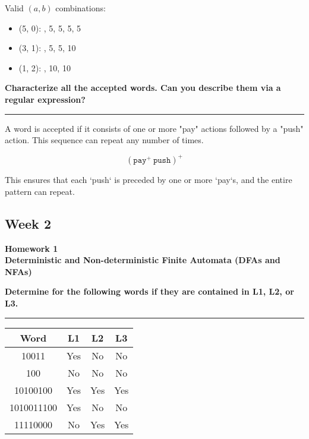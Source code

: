 \documentclass{article}
\theoremstyle{theorem}
\theoremstyle{definition}
\theoremstyle{remark}
\begin{document}
Valid \((a, b)\) combinations:
\begin{itemize}
    \item (5, 0): , 5, 5, 5, 5
    \item (3, 1): , 5, 5, 10
    \item (1, 2): , 10, 10
\end{itemize}

\vspace{1em}

\textbf{Characterize all the accepted words. Can you describe them via a regular expression?}

\vspace{0.5em}
\hrule
\vspace{0.5em}

A word is accepted if it consists of one or more "pay" actions followed by a "push" action.  
This sequence can repeat any number of times.

\[
(\texttt{pay}^+\ \texttt{push})^+
\]

This ensures that each `push` is preceded by one or more `pay`s, and the entire pattern can repeat.

\subsection{Week 2}
\textbf{Homework 1} \\
\textbf{Deterministic and Non-deterministic Finite Automata (DFAs and NFAs)}\\

\vspace{0.5em}

\textbf{Determine for the following words if they are contained in L1, L2, or L3.}

\vspace{0.5em}
\hrule
\vspace{0.5em}

\begin{center}
\begin{tabular}{|c|c|c|c|}
\hline
\textbf{Word} & \textbf{L1} & \textbf{L2} & \textbf{L3} \\
\hline
10011 & Yes & No & No \\
100   & No  & No & No \\
10100100 & Yes & Yes & Yes \\
1010011100 & Yes & No & No \\
11110000 & No & Yes & Yes \\
\hline
\end{tabular}
\end{center}
\end{document}
